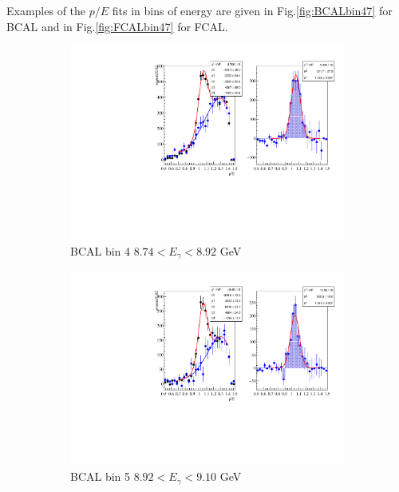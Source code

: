 \documentclass[%
preprint,
nofootinbib,
 amsmath,amssymb,
 aps,
floatfix,
]{revtex4-1}
\begin{document}
Examples of the $p/E$ fits in bins of energy are given in 
Fig.\ref{fig:BCALbin47} for BCAL and in Fig.\ref{fig:FCALbin47} for FCAL.
\begin{figure}[h]
  \begin{subfigure}[b]{0.49\textwidth}
    \includegraphics[width=\textwidth]{./fig/AN2_PovE_BCAL_bin4.pdf}
    \caption{BCAL bin 4 $8.74<E_\gamma <8.92$ GeV }
    \label{fig:BCALbin4}
  \end{subfigure}
  \begin{subfigure}[b]{0.49\textwidth}
    \includegraphics[width=\textwidth]{./fig/AN2_PovE_BCAL_bin5.pdf}
    \caption{BCAL bin 5 $8.92<E_\gamma <9.10$ GeV }
    \label{fig:BCALbin5}
  \end{subfigure}
  \begin{subfigure}[b]{0.49\textwidth}

\end{subfigure}
\end{figure}
\end{document}
